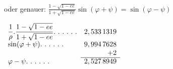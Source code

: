 \begin{minipage}[t]{.64\linewidth}\vspace{0pt}\centering
oder genauer: \(\displaystyle\frac{1-\sqrt{1-ee}}{1+\sqrt{1-ee}}\sin(\varphi+\psi)=\sin(\varphi-\psi)\)
\par\medskip
\(\begin{array}{lr}
\displaystyle\frac1\rho.\frac{1-\sqrt{1-ee}}{1+\sqrt{1-ee}}\ldotp\,\ldotp\,\ldotp\,\ldotp\,\ldotp\,\ldotp&2,533\,1319\\[1.3ex]
\sin(\varphi+\psi)\ldotp\,\ldotp\,\ldotp\,\ldotp\,\ldotp\,\ldotp&9,994\,7628\\
&+2\\\cline{2-2}
\varphi-\psi\ldotp\,\ldotp\,\ldotp\,\ldotp\,\ldotp\,\ldotp&2,527\,8949
\end{array}\)
\end{minipage}
\par\endgroup

